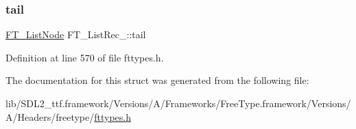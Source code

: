 \subsubsection{\texorpdfstring{tail}{tail}}
{\footnotesize\ttfamily \mbox{\hyperlink{fttypes_8h_a155e4980a42c16fbc221ad40b2b59695}{F\+T\+\_\+\+List\+Node}} F\+T\+\_\+\+List\+Rec\+\_\+\+::tail}



Definition at line 570 of file fttypes.\+h.



The documentation for this struct was generated from the following file\+:\begin{DoxyCompactItemize}
\item 
lib/\+S\+D\+L2\+\_\+ttf.\+framework/\+Versions/\+A/\+Frameworks/\+Free\+Type.\+framework/\+Versions/\+A/\+Headers/freetype/\mbox{\hyperlink{fttypes_8h}{fttypes.\+h}}\end{DoxyCompactItemize}
